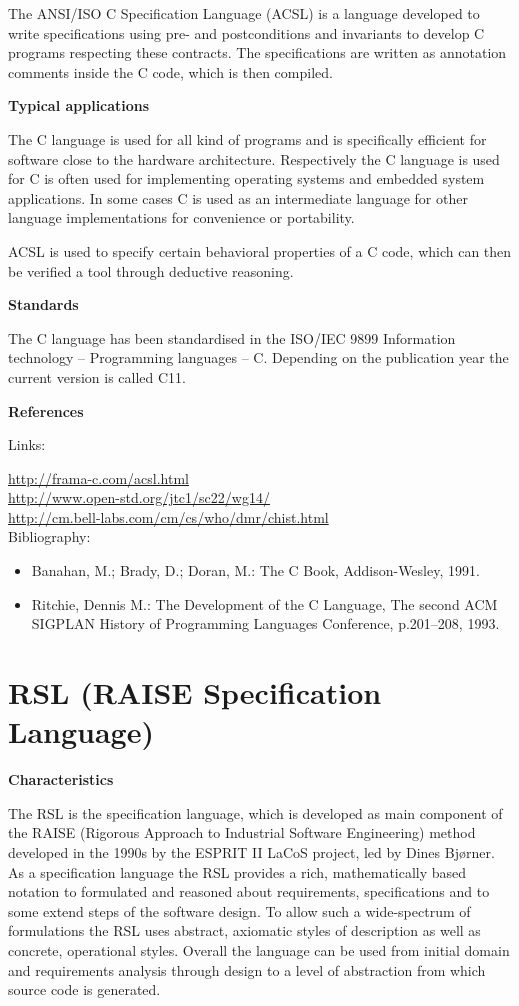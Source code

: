 \documentclass{./template/openetcs_report}
\begin{document}
The ANSI/ISO C Specification Language (ACSL) is a language developed to write specifications using pre- and postconditions and invariants to develop C programs respecting these contracts. The specifications are written as annotation comments inside the C code, which is then compiled.

	\textbf{Typical applications}

The C language is used for all kind of programs and is specifically efficient for software close to the hardware architecture. Respectively the C language is used for C is often used for implementing operating systems and embedded system applications. 
In some cases C is used as an intermediate language for other language implementations for convenience or portability.

ACSL is used to specify certain behavioral properties of a C code, which can then be verified a tool through deductive reasoning.

	\textbf{Standards}

The C language has been standardised in the ISO/IEC 9899 Information technology -- Programming languages -- C.
Depending on the publication year the current version is called C11.

	\textbf{References}

Links:

\url{http://frama-c.com/acsl.html} \\[4pt]
\url{http://www.open-std.org/jtc1/sc22/wg14/} \\[4pt]
\url{http://cm.bell-labs.com/cm/cs/who/dmr/chist.html} \\[4pt]


Bibliography:

\begin{itemize}
\item Banahan, M.; Brady, D.; Doran, M.: The C Book, Addison-Wesley, 1991.
\item Ritchie, Dennis M.: The Development of the C Language, The second ACM SIGPLAN History of Programming Languages Conference, p.201–208, 1993.
\end{itemize}

\section {RSL (RAISE Specification Language)}


	\textbf{Characteristics}

The RSL is the specification language, which is developed as main component of the RAISE (Rigorous Approach to Industrial Software Engineering) method developed in the 1990s by the ESPRIT II LaCoS project, led by Dines Bjørner. As a specification language the RSL provides a rich, mathematically based notation to formulated and reasoned about requirements, specifications and to some extend steps of the software design. To allow such a wide-spectrum of formulations the RSL uses abstract, axiomatic styles of description as well as concrete, operational styles. Overall the language can be used from initial domain and requirements analysis through design to a level of abstraction from which source code is generated. 
\end{document}
